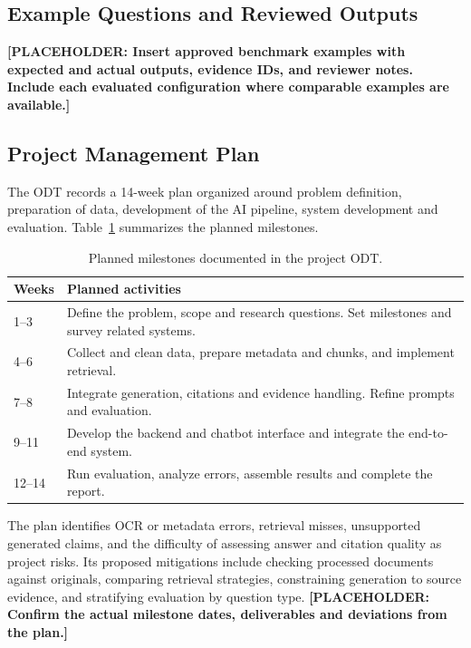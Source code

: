 \documentclass[oneside]{sn-jnl}
\newcommand{\pending}[1]{\textbf{\textcolor{red!65!black}{[PLACEHOLDER: #1]}}}
\begin{document}
\subsection{Example Questions and Reviewed Outputs}
\pending{Insert approved benchmark examples with expected and actual outputs, evidence IDs, and reviewer notes. Include each evaluated configuration where comparable examples are available.}

\subsection{Project Management Plan}
The ODT records a 14-week plan organized around problem definition, preparation of data, development of the AI pipeline, system development and evaluation. Table~\ref{tab:timeline} summarizes the planned milestones.

\begin{table}[htbp]
\centering
\caption{Planned milestones documented in the project ODT.}
\label{tab:timeline}
\begin{tabularx}{\linewidth}{lX}
\toprule
Weeks & Planned activities\\
\midrule
1--3 & Define the problem, scope and research questions. Set milestones and survey related systems.\\
4--6 & Collect and clean data, prepare metadata and chunks, and implement retrieval.\\
7--8 & Integrate generation, citations and evidence handling. Refine prompts and evaluation.\\
9--11 & Develop the backend and chatbot interface and integrate the end-to-end system.\\
12--14 & Run evaluation, analyze errors, assemble results and complete the report.\\
\bottomrule
\end{tabularx}
\end{table}

The plan identifies OCR or metadata errors, retrieval misses, unsupported generated claims, and the difficulty of assessing answer and citation quality as project risks. Its proposed mitigations include checking processed documents against originals, comparing retrieval strategies, constraining generation to source evidence, and stratifying evaluation by question type.
\pending{Confirm the actual milestone dates, deliverables and deviations from the plan.}
\end{document}
